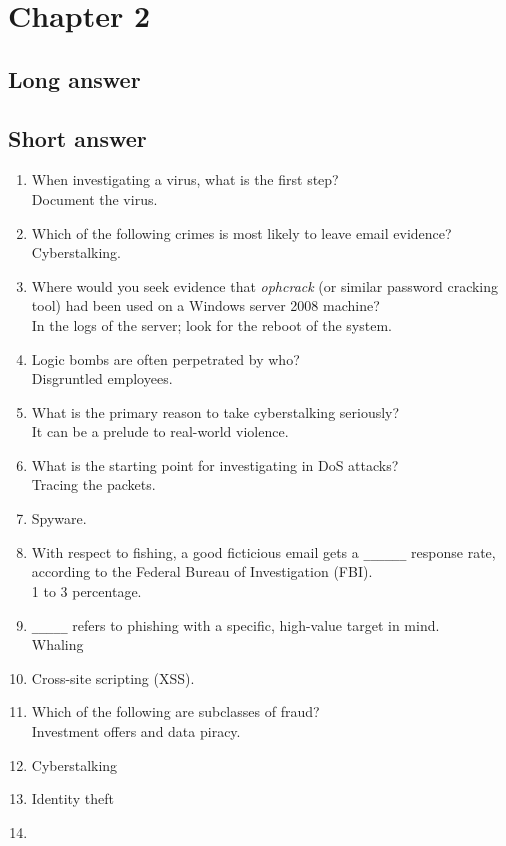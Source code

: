 \section{Chapter 2}
\subsection{Long answer}
\begin{enumerate}
\end{enumerate}

\subsection{Short answer}
\begin{enumerate}
    \item When investigating a virus, what is the first step?\\Document the virus.
    \item Which of the following crimes is most likely to leave email evidence?\\Cyberstalking.
    \item Where would you seek evidence that \textit{ophcrack} (or similar password cracking tool) had been used on a Windows server 2008 machine?\\In the logs of the server; look for the reboot of the system.
    \item Logic bombs are often perpetrated by who?\\Disgruntled employees.
    \item What is the primary reason to take cyberstalking seriously?\\It can be a prelude to real-world violence.
    \item What is the starting point for investigating in DoS attacks?\\Tracing the packets.
    \item Spyware.
    \item With respect to fishing, a good ficticious email gets a \verb|______| response rate, according to the Federal Bureau of Investigation (FBI).\\1 to 3 percentage.
    \item \verb|_____| refers to phishing with a specific, high-value target in mind.\\Whaling
    \item Cross-site scripting (XSS).
    \item Which of the following are subclasses of fraud?\\Investment offers and data piracy.
    \item Cyberstalking
    \item Identity theft
    \item 
\end{enumerate}